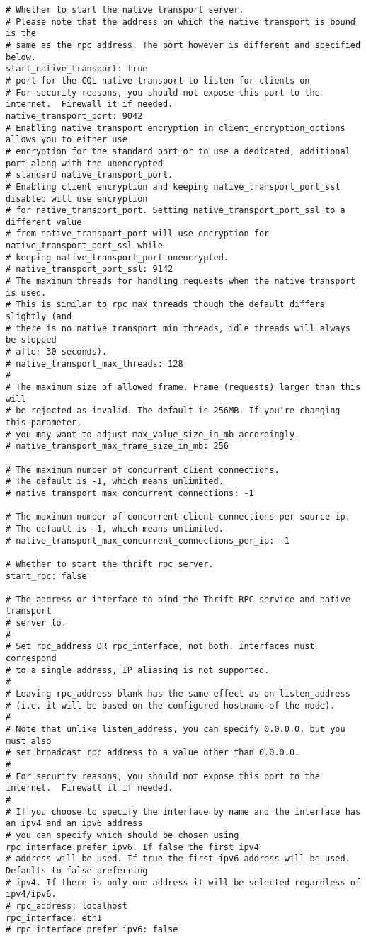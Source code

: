 \begin{verbatim}
# Whether to start the native transport server.
# Please note that the address on which the native transport is bound is the
# same as the rpc_address. The port however is different and specified below.
start_native_transport: true
# port for the CQL native transport to listen for clients on
# For security reasons, you should not expose this port to the internet.  Firewall it if needed.
native_transport_port: 9042
# Enabling native transport encryption in client_encryption_options allows you to either use
# encryption for the standard port or to use a dedicated, additional port along with the unencrypted
# standard native_transport_port.
# Enabling client encryption and keeping native_transport_port_ssl disabled will use encryption
# for native_transport_port. Setting native_transport_port_ssl to a different value
# from native_transport_port will use encryption for native_transport_port_ssl while
# keeping native_transport_port unencrypted.
# native_transport_port_ssl: 9142
# The maximum threads for handling requests when the native transport is used.
# This is similar to rpc_max_threads though the default differs slightly (and
# there is no native_transport_min_threads, idle threads will always be stopped
# after 30 seconds).
# native_transport_max_threads: 128
#
# The maximum size of allowed frame. Frame (requests) larger than this will
# be rejected as invalid. The default is 256MB. If you're changing this parameter,
# you may want to adjust max_value_size_in_mb accordingly.
# native_transport_max_frame_size_in_mb: 256

# The maximum number of concurrent client connections.
# The default is -1, which means unlimited.
# native_transport_max_concurrent_connections: -1

# The maximum number of concurrent client connections per source ip.
# The default is -1, which means unlimited.
# native_transport_max_concurrent_connections_per_ip: -1

# Whether to start the thrift rpc server.
start_rpc: false

# The address or interface to bind the Thrift RPC service and native transport
# server to.
#
# Set rpc_address OR rpc_interface, not both. Interfaces must correspond
# to a single address, IP aliasing is not supported.
#
# Leaving rpc_address blank has the same effect as on listen_address
# (i.e. it will be based on the configured hostname of the node).
#
# Note that unlike listen_address, you can specify 0.0.0.0, but you must also
# set broadcast_rpc_address to a value other than 0.0.0.0.
#
# For security reasons, you should not expose this port to the internet.  Firewall it if needed.
#
# If you choose to specify the interface by name and the interface has an ipv4 and an ipv6 address
# you can specify which should be chosen using rpc_interface_prefer_ipv6. If false the first ipv4
# address will be used. If true the first ipv6 address will be used. Defaults to false preferring
# ipv4. If there is only one address it will be selected regardless of ipv4/ipv6.
# rpc_address: localhost
rpc_interface: eth1
# rpc_interface_prefer_ipv6: false


\end{verbatim}

